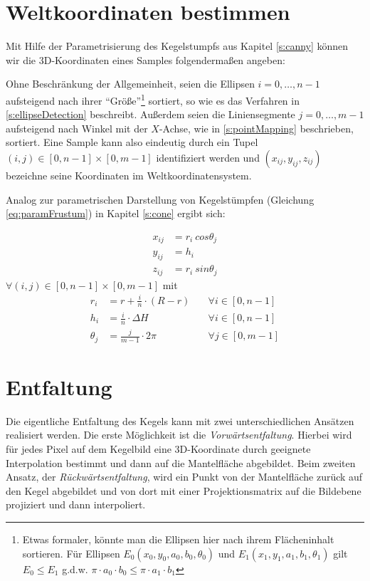 \section{Weltkoordinaten bestimmen}

Mit Hilfe der Parametrisierung des Kegelstumpfs aus Kapitel \ref{s:canny} können wir die 3D-Koordinaten eines Samples folgendermaßen angeben:

Ohne Beschränkung der Allgemeinheit, seien die Ellipsen $i = 0,\dotsc,n - 1$ aufsteigend nach ihrer "`Größe"'\footnote{Etwas formaler, könnte man die Ellipsen hier nach ihrem Flächeninhalt sortieren. Für Ellipsen $E_0(x_0,y_0,a_0, b_0, \theta_0)$ und $E_1(x_1,y_1,a_1, b_1,\theta_1)$ gilt $E_0 \leq E_1$ g.d.w. $\pi\cdot a_0 \cdot b_0 \leq \pi \cdot a_1 \cdot b_1$} sortiert, so wie es das Verfahren in \ref{s:ellipseDetection} beschreibt.
Außerdem seien die Liniensegmente $j = 0,\dotsc,m - 1$ aufsteigend nach Winkel mit der $X$-Achse, wie in \ref{s:pointMapping} beschrieben, sortiert. 
Eine Sample kann also eindeutig durch ein Tupel $(i,j) \in [0,n-1]\times [0,m-1]$ identifiziert werden und $(x_{ij},y_{ij},z_{ij})$ bezeichne seine Koordinaten im Weltkoordinatensystem. 

Analog zur parametrischen Darstellung von Kegelstümpfen (Gleichung \ref{eq:paramFrustum}) in Kapitel \ref{s:cone} ergibt sich:

\begin{equation*}
\begin{aligned}
x_{ij} &= r_i~cos \theta_j \\
y_{ij} &= h_i\\
z_{ij} &= r_i~sin \theta_j
\end{aligned}
\end{equation*}
$\forall (i,j) \in [0,n-1]\times [0,m-1]$ mit 
\begin{equation*}
\begin{aligned}
r_i &= r + \frac{i}{n}\cdot(R - r) \quad&\forall i\in[0,n-1]\\
h_i &= \frac{i}{n}\cdot\Delta H &\forall i\in[0,n-1]\\
\theta_j &= \frac{j}{m-1} \cdot  2\pi  &\forall j\in[0,m-1]
\end{aligned}
\end{equation*}

\section{Entfaltung}
\label{s:unfolding}
Die eigentliche Entfaltung des Kegels kann mit zwei unterschiedlichen Ansätzen realisiert werden. 
Die erste Möglichkeit ist die \textit{Vorwärtsentfaltung}. Hierbei wird für jedes Pixel auf dem Kegelbild eine 3D-Koordinate durch geeignete Interpolation bestimmt und dann auf die Mantelfläche abgebildet. Beim zweiten Ansatz, der \textit{Rückwärtsentfaltung}, wird ein Punkt von der Mantelfläche zurück auf den Kegel abgebildet und von dort mit einer Projektionsmatrix auf die Bildebene projiziert und dann interpoliert. 

